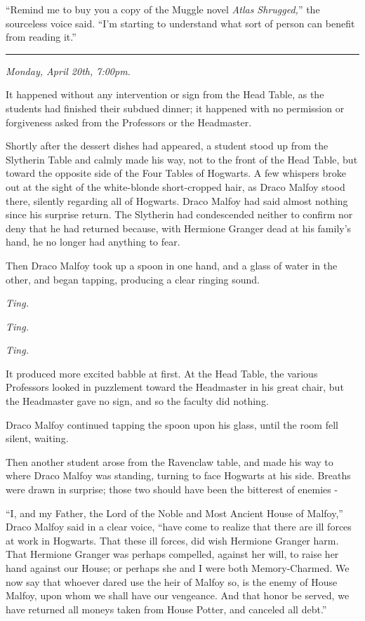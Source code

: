 ``Remind me to buy you a copy of the Muggle novel \emph{Atlas Shrugged,}'' the sourceless voice said. ``I'm starting to understand what sort of person can benefit from reading it.''

\begin{center}\rule{3in}{0.4pt}\end{center}

\emph{Monday, April 20th, 7:00pm.}

It happened without any intervention or sign from the Head Table, as the students had finished their subdued dinner; it happened with no permission or forgiveness asked from the Professors or the Headmaster.

Shortly after the dessert dishes had appeared, a student stood up from the Slytherin Table and calmly made his way, not to the front of the Head Table, but toward the opposite side of the Four Tables of Hogwarts. A few whispers broke out at the sight of the white-blonde short-cropped hair, as Draco Malfoy stood there, silently regarding all of Hogwarts. Draco Malfoy had said almost nothing since his surprise return. The Slytherin had condescended neither to confirm nor deny that he had returned because, with Hermione Granger dead at his family's hand, he no longer had anything to fear.

Then Draco Malfoy took up a spoon in one hand, and a glass of water in the other, and began tapping, producing a clear ringing sound.

\emph{Ting.}

\emph{Ting.}

\emph{Ting.}

It produced more excited babble at first. At the Head Table, the various Professors looked in puzzlement toward the Headmaster in his great chair, but the Headmaster gave no sign, and so the faculty did nothing.

Draco Malfoy continued tapping the spoon upon his glass, until the room fell silent, waiting.

Then another student arose from the Ravenclaw table, and made his way to where Draco Malfoy was standing, turning to face Hogwarts at his side. Breaths were drawn in surprise; those two should have been the bitterest of enemies -

``I, and my Father, the Lord of the Noble and Most Ancient House of Malfoy,'' Draco Malfoy said in a clear voice, ``have come to realize that there are ill forces at work in Hogwarts. That these ill forces, did wish Hermione Granger harm. That Hermione Granger was perhaps compelled, against her will, to raise her hand against our House; or perhaps she and I were both Memory-Charmed. We now say that whoever dared use the heir of Malfoy so, is the enemy of House Malfoy, upon whom we shall have our vengeance. And that honor be served, we have returned all moneys taken from House Potter, and canceled all debt.''

